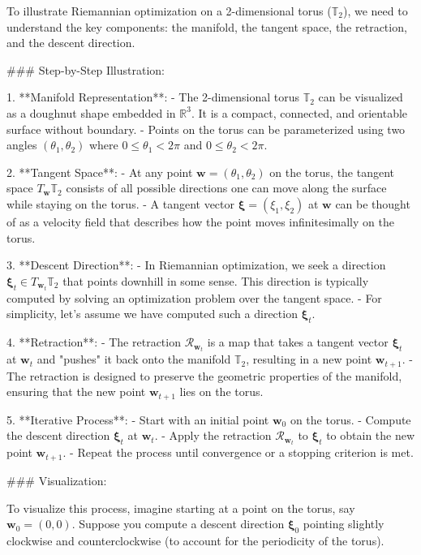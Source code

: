To illustrate Riemannian optimization on a 2-dimensional torus (\(\mathbb{T}_2\)), we need to understand the key components: the manifold, the tangent space, the retraction, and the descent direction.

### Step-by-Step Illustration:

1. **Manifold Representation**:
   - The 2-dimensional torus \(\mathbb{T}_2\) can be visualized as a doughnut shape embedded in \(\mathbb{R}^3\). It is a compact, connected, and orientable surface without boundary.
   - Points on the torus can be parameterized using two angles \((\theta_1, \theta_2)\) where \(0 \leq \theta_1 < 2\pi\) and \(0 \leq \theta_2 < 2\pi\).

2. **Tangent Space**:
   - At any point \(\mathbf{w} = (\theta_1, \theta_2)\) on the torus, the tangent space \(T_{\mathbf{w}} \mathbb{T}_2\) consists of all possible directions one can move along the surface while staying on the torus.
   - A tangent vector \(\boldsymbol{\xi} = (\xi_1, \xi_2)\) at \(\mathbf{w}\) can be thought of as a velocity field that describes how the point moves infinitesimally on the torus.

3. **Descent Direction**:
   - In Riemannian optimization, we seek a direction \(\boldsymbol{\xi}_t \in T_{\mathbf{w}_t} \mathbb{T}_2\) that points downhill in some sense. This direction is typically computed by solving an optimization problem over the tangent space.
   - For simplicity, let's assume we have computed such a direction \(\boldsymbol{\xi}_t\).

4. **Retraction**:
   - The retraction \(\mathcal{R}_{\mathbf{w}_t}\) is a map that takes a tangent vector \(\boldsymbol{\xi}_t\) at \(\mathbf{w}_t\) and "pushes" it back onto the manifold \(\mathbb{T}_2\), resulting in a new point \(\mathbf{w}_{t+1}\).
   - The retraction is designed to preserve the geometric properties of the manifold, ensuring that the new point \(\mathbf{w}_{t+1}\) lies on the torus.

5. **Iterative Process**:
   - Start with an initial point \(\mathbf{w}_0\) on the torus.
   - Compute the descent direction \(\boldsymbol{\xi}_t\) at \(\mathbf{w}_t\).
   - Apply the retraction \(\mathcal{R}_{\mathbf{w}_t}\) to \(\boldsymbol{\xi}_t\) to obtain the new point \(\mathbf{w}_{t+1}\).
   - Repeat the process until convergence or a stopping criterion is met.

### Visualization:

To visualize this process, imagine starting at a point on the torus, say \(\mathbf{w}_0 = (0, 0)\). Suppose you compute a descent direction \(\boldsymbol{\xi}_0\) pointing slightly clockwise and counterclockwise (to account for the periodicity of the torus).

